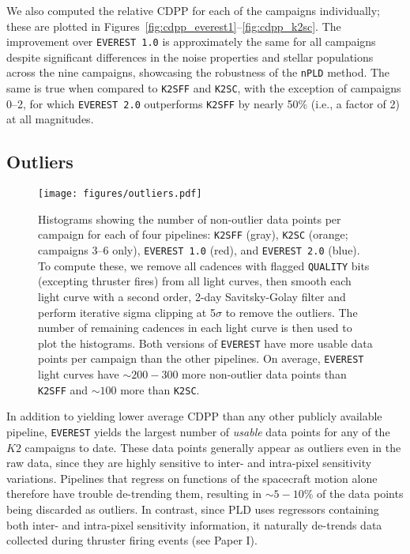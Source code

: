 \documentclass[]{aastex62}
\begin{document}
We also computed the relative CDPP for each of the campaigns individually; these are
plotted in Figures~\ref{fig:cdpp_everest1}--\ref{fig:cdpp_k2sc}. The improvement
over \texttt{EVEREST 1.0} is approximately the same for all campaigns despite significant
differences in the noise properties and stellar populations across the nine campaigns,
showcasing the robustness of the \texttt{nPLD} method.
The same is true when compared to \texttt{K2SFF} and \texttt{K2SC}, with the exception of
campaigns 0--2, for which \texttt{EVEREST 2.0} outperforms \texttt{K2SFF} by nearly 50\%
(i.e., a factor of 2) at all magnitudes.

\subsection{Outliers}

\begin{figure}[hbt]
  \begin{center}
      \texttt{[image: figures/outliers.pdf]}
       \caption{Histograms showing the number of non-outlier data points per campaign for each
        of four pipelines: \texttt{K2SFF} (gray), \texttt{K2SC} (orange; campaigns 3--6 only),
        \texttt{EVEREST 1.0} (red), and \texttt{EVEREST 2.0} (blue). To compute these, we remove all cadences
        with flagged \texttt{QUALITY} bits (excepting thruster fires) from all light curves, then
        smooth each light curve with a second order, 2-day Savitsky-Golay filter and perform iterative
        sigma clipping at 5$\sigma$ to remove the outliers. The number of remaining cadences in
        each light curve is then used to plot the histograms. Both versions of \texttt{EVEREST}
        have more usable data points per campaign than the other pipelines. On average,
        \texttt{EVEREST} light curves have ${\sim}200-300$ more non-outlier data points than \texttt{K2SFF}
        and ${\sim}100$ more than \texttt{K2SC}.}
     \label{fig:outliers}
  \end{center}
\end{figure}

In addition to yielding lower average CDPP than any other publicly available pipeline,
\texttt{EVEREST} yields the largest number of \emph{usable} data points for any of the
$K2$ campaigns to date. These data points generally appear as outliers even in the
raw data, since they are highly sensitive to inter- and intra-pixel sensitivity variations.
Pipelines that regress on functions of the spacecraft motion alone therefore have trouble
de-trending them, resulting in ${\sim}5-10\%$ of the data points being discarded as outliers.
In contrast, since PLD uses regressors containing both inter- and intra-pixel sensitivity
information, it naturally de-trends data collected during thruster firing events (see Paper I).
\end{document}

